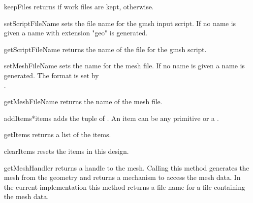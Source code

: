 \begin{methoddesc}[Design]{keepFiles}{}
returns \True if work files are kept, \False otherwise.
\end{methoddesc}

\begin{methoddesc}[Design]{setScriptFileName}{}
sets the file name for the gmsh input script.
If no name is given a name with extension "geo" is generated.
\end{methoddesc}

\begin{methoddesc}[Design]{getScriptFileName}{}
returns the name of the file for the gmsh script.
\end{methoddesc}

\begin{methoddesc}[Design]{setMeshFileName}{}
sets the name for the mesh file. If no name is given a name is generated.
The format is set by \\.
\end{methoddesc}

\begin{methoddesc}[Design]{getMeshFileName}{}
returns the name of the mesh file.
\end{methoddesc}

\begin{methoddesc}[Design]{addItems}{*items}
adds the tuple of . An item can be any primitive or a
.
\end{methoddesc}

\begin{methoddesc}[Design]{getItems}{}
returns a list of the items.
\end{methoddesc}

\begin{methoddesc}[Design]{clearItems}{}
resets the items in this design.
\end{methoddesc}

\begin{methoddesc}[Design]{getMeshHandler}{}
returns a handle to the mesh.
Calling this method generates the mesh from the geometry and returns a
mechanism to access the mesh data. In the current implementation this
method returns a file name for a file containing the mesh data.
\end{methoddesc}

